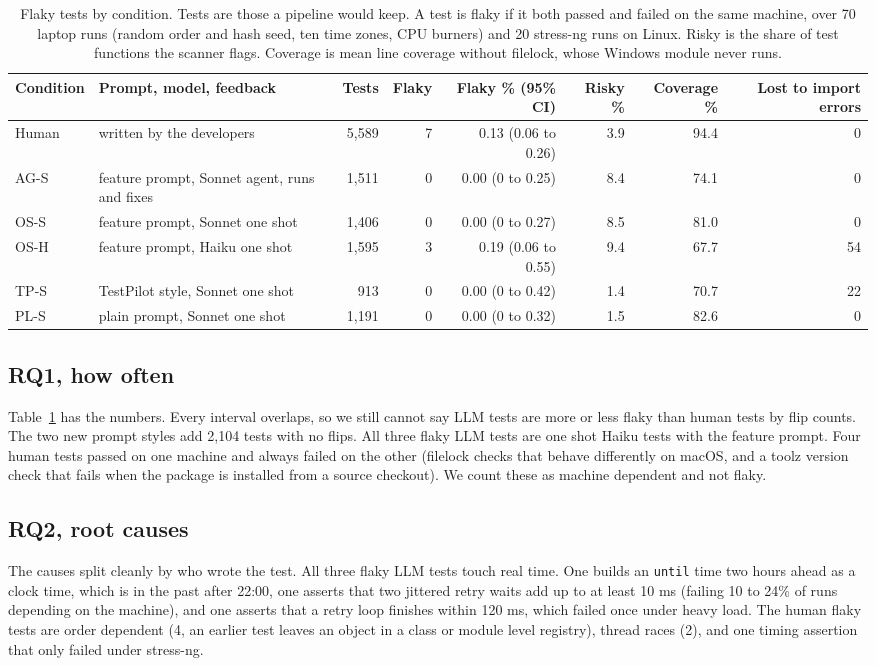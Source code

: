 \documentclass[sigconf,nonacm]{acmart}
\begin{document}
\begin{table}[t]
\caption{Flaky tests by condition. Tests are those a pipeline would keep. A test is flaky if it both passed and failed on the same machine, over 70 laptop runs (random order and hash seed, ten time zones, CPU burners) and 20 stress-ng runs on Linux. Risky is the share of test functions the scanner flags. Coverage is mean line coverage without filelock, whose Windows module never runs.}
\label{tab:rq1}
\small
\begin{tabular}{llrrrrrr}
\toprule
Condition & Prompt, model, feedback & Tests & Flaky & Flaky \% (95\% CI) & Risky \% & Coverage \% & Lost to import errors \\
\midrule
Human & written by the developers & 5,589 & 7 & 0.13 (0.06 to 0.26) & 3.9 & 94.4 & 0 \\
AG-S & feature prompt, Sonnet agent, runs and fixes & 1,511 & 0 & 0.00 (0 to 0.25) & 8.4 & 74.1 & 0 \\
OS-S & feature prompt, Sonnet one shot & 1,406 & 0 & 0.00 (0 to 0.27) & 8.5 & 81.0 & 0 \\
OS-H & feature prompt, Haiku one shot & 1,595 & 3 & 0.19 (0.06 to 0.55) & 9.4 & 67.7 & 54 \\
TP-S & TestPilot style, Sonnet one shot & 913 & 0 & 0.00 (0 to 0.42) & 1.4 & 70.7 & 22 \\
PL-S & plain prompt, Sonnet one shot & 1,191 & 0 & 0.00 (0 to 0.32) & 1.5 & 82.6 & 0 \\
\bottomrule
\end{tabular}
\end{table}

\subsection{RQ1, how often}
Table~\ref{tab:rq1} has the numbers. Every interval overlaps, so we still cannot say LLM tests are more or less flaky than human tests by flip counts. The two new prompt styles add 2,104 tests with no flips. All three flaky LLM tests are one shot Haiku tests with the feature prompt. Four human tests passed on one machine and always failed on the other (filelock checks that behave differently on macOS, and a toolz version check that fails when the package is installed from a source checkout). We count these as machine dependent and not flaky.

\subsection{RQ2, root causes}
\label{sec:rq2}
The causes split cleanly by who wrote the test. All three flaky LLM tests touch real time. One builds an \texttt{until} time two hours ahead as a clock time, which is in the past after 22:00, one asserts that two jittered retry waits add up to at least 10 ms (failing 10 to 24\% of runs depending on the machine), and one asserts that a retry loop finishes within 120 ms, which failed once under heavy load. The human flaky tests are order dependent (4, an earlier test leaves an object in a class or module level registry), thread races (2), and one timing assertion that only failed under stress-ng.
\end{document}
